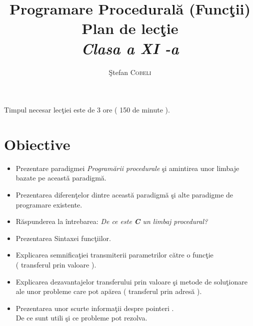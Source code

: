 \documentclass{article}
\title{\textbf{Programare Procedural\u a (Func\c tii) } \\ Plan de lec\c tie \\ \textit{ Clasa a  XI -a} } %
\author{\c Stefan \textsc{Cobeli}} %
\begin{document}
\maketitle %



Timpul necesar lec\c tiei este de 3 ore ( 150 de minute ).
\section{Obiective}

\begin{itemize}

\item Prezentare paradigmei \textit{Program\u arii procedurale} \c si amintirea unor limbaje bazate pe aceast\u a paradigm\u a.

\item Prezentarea diferen\c telor dintre aceast\u a paradigm\u a \c si alte paradigme de programare existente.

\item R\u aspunderea la \^ intrebarea: \textit{ De ce este \textbf{C} un limbaj procedural?}

\item Prezentarea Sintaxei func\c tiilor.

\item Explicarea semnifica\c tiei transmiterii parametrilor c\u atre o func\c tie\\ ( transferul prin valoare ).

\item Explicarea dezavantajelor transferului prin valoare \c si metode de solu\c tionare ale unor probleme care pot ap\u area ( transferul prin adres\u a ).

\item Prezentarea unor scurte informa\c tii despre pointeri .\\ De ce sunt utili \c si ce probleme pot rezolva.


\end{itemize}
\label{definitions}
\end{document}
